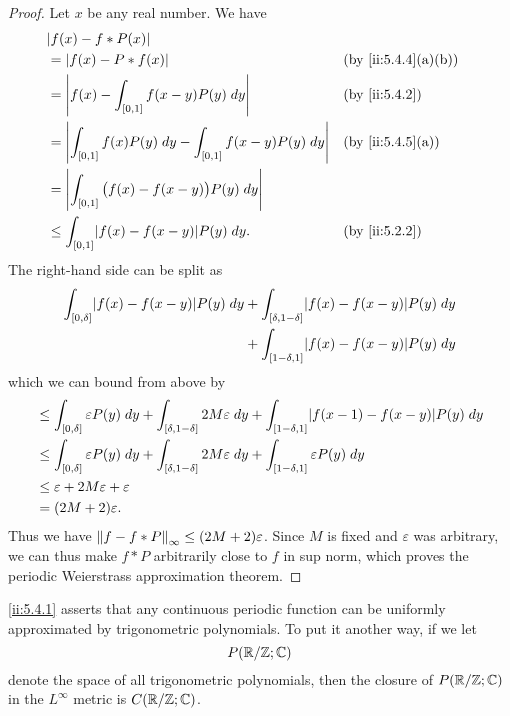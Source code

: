 \begin{proof}
  Let \(x\) be any real number.
  We have
  \begin{align*}
     & \abs{f(x) - f * P(x)}                                                                             \\
     & = \abs{f(x) - P * f(x)}                                                   &  & \by{ii:5.4.4}[a,b] \\
     & = \abs{f(x) - \int_{[0, 1]} f(x - y) P(y) \; dy}                          &  & \by{ii:5.4.2}      \\
     & = \abs{\int_{[0, 1]} f(x) P(y) \; dy - \int_{[0, 1]} f(x - y) P(y) \; dy} &  & \by{ii:5.4.5}[a]   \\
     & = \abs{\int_{[0, 1]} \big(f(x) - f(x - y)\big) P(y) \; dy}                                        \\
     & \leq \int_{[0, 1]} \abs{f(x) - f(x - y)} P(y) \; dy.                      &  & \by{ii:5.2.2}
  \end{align*}
  The right-hand side can be split as
  \begin{align*}
    \int_{[0, \delta]} \abs{f(x) - f(x - y)} P(y) \; dy & + \int_{[\delta, 1 - \delta]} \abs{f(x) - f(x - y)} P(y) \; dy \\
                                                        & + \int_{[1 - \delta, 1]} \abs{f(x) - f(x - y)} P(y) \; dy
  \end{align*}
  which we can bound from above by
  \begin{align*}
     & \leq \int_{[0, \delta]} \varepsilon P(y) \; dy + \int_{[\delta, 1 - \delta]} 2 M \varepsilon \; dy + \int_{[1 - \delta, 1]} \abs{f(x - 1) - f(x - y)} P(y) \; dy \\
     & \leq \int_{[0, \delta]} \varepsilon P(y) \; dy + \int_{[\delta, 1 - \delta]} 2 M \varepsilon \; dy + \int_{[1 - \delta, 1]} \varepsilon P(y) \; dy               \\
     & \leq \varepsilon + 2 M \varepsilon + \varepsilon                                                                                                                 \\
     & = (2M + 2) \varepsilon.
  \end{align*}
  Thus we have \(\norm*{f - f * P}_{\infty} \leq (2M + 2) \varepsilon\).
  Since \(M\) is fixed and \(\varepsilon\) was arbitrary, we can thus make \(f * P\) arbitrarily close to \(f\) in sup norm, which proves the periodic Weierstrass approximation theorem.
\end{proof}

\begin{note}
  \cref{ii:5.4.1} asserts that any continuous periodic function can be uniformly approximated by trigonometric polynomials.
  To put it another way, if we let
  \[
    P(\R / \Z ; \C)
  \]
  denote the space of all trigonometric polynomials, then the closure of \(P(\R / \Z ; \C)\) in the \(L^\infty\) metric is \(C(\R / \Z ; \C)\).
\end{note}


